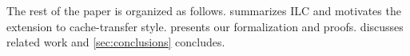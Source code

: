 The rest of the paper is organized as follows.  summarizes
ILC and motivates the extension to cache-transfer style.
 presents our formalization and proofs.
\iftoggle{poplForThesis}{
\Cref{sec:case-studies} presents our case studies and benchmarks.
\Cref{sec:cts-limitations} discusses limitations and future work.
}{
\Cref{sec:case-studies} discusses our case studies, benchmarks,
limitations and future work.
}
discusses related work and \cref{sec:conclusions} concludes.
